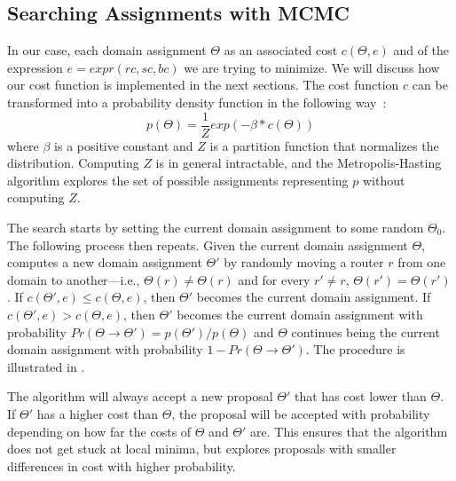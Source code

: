 \subsection{Searching Assignments with MCMC}

In our case, each domain assignment $\Theta$
as an associated cost $c(\Theta, e)$
and of the expression 
$e=expr(rc, sc, bc)$
we are trying to minimize.
We will discuss how our cost function is implemented in the next sections.
The cost function $c$ can be transformed 
into a probability density function in the following way~\cite{mcmcbook}:
\begin{equation}
	p(\Theta) = \frac{1}{Z}exp(-\beta * c(\Theta))
\end{equation}
where $\beta$ is a positive constant and $Z$ is a partition function  that
normalizes the distribution. Computing $Z$ is in general 
intractable, and the Metropolis-Hasting algorithm 
explores the set of possible assignments representing $p$ without computing $Z$. 

The search starts by setting the current domain assignment 
to some random $\Theta_0$.
The following process then repeats.
Given the current domain
assignment $\Theta$, 
computes a new domain assignment $\Theta'$ by randomly
moving a router $r$ from one domain to another---i.e., $\Theta(r)\neq \Theta(r)$ and
for every $r'\neq r$, $\Theta(r')= \Theta(r')$.
If $c(\Theta',e)\leq c(\Theta,e)$, then $\Theta'$ becomes the current domain assignment.
If $c(\Theta',e)>c(\Theta,e)$, then $\Theta'$ becomes the current domain assignment
with probability $Pr(\Theta \rightarrow \Theta')=p(\Theta')/p(\Theta)$ and 
 $\Theta$ continues being the current domain assignment with probability $1-Pr(\Theta \rightarrow \Theta')$.
\iffull
The procedure is illustrated in .
\fi

The algorithm will always accept a new proposal $\Theta'$
that has cost lower than $\Theta$. If $\Theta'$ has a 
higher cost than $\Theta$, the proposal will be 
accepted with probability depending on 
how far the costs of $\Theta$ and $\Theta'$ are. This ensures that 
the algorithm does not get stuck at local minima, but 
explores proposals with smaller differences in cost with 
higher probability.


